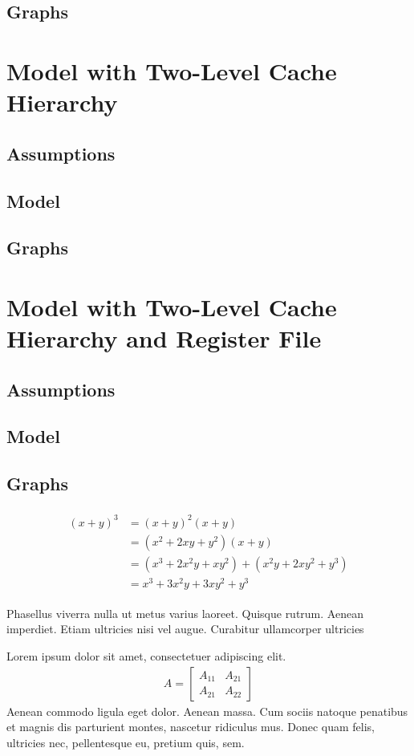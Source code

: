\documentclass[paper=a4, fontsize=11pt]{scrartcl} %
\numberwithin{equation}{section} %
\numberwithin{figure}{section} %
\numberwithin{table}{section} %
\begin{document}
\subsection{Graphs}
\section{Model with Two-Level Cache Hierarchy}
\subsection{Assumptions}
\subsection{Model}
\subsection{Graphs}
\section{Model with Two-Level Cache Hierarchy and Register File}
\subsection{Assumptions}
\subsection{Model}
\subsection{Graphs}

\begin{align} 
\begin{split}
(x+y)^3 	&= (x+y)^2(x+y)\\
&=(x^2+2xy+y^2)(x+y)\\
&=(x^3+2x^2y+xy^2) + (x^2y+2xy^2+y^3)\\
&=x^3+3x^2y+3xy^2+y^3
\end{split}					
\end{align}

Phasellus viverra nulla ut metus varius laoreet. Quisque rutrum. Aenean imperdiet. Etiam ultricies nisi vel augue. Curabitur ullamcorper ultricies



Lorem ipsum dolor sit amet, consectetuer adipiscing elit. 
\begin{align}
A = 
\begin{bmatrix}
A_{11} & A_{21} \\
A_{21} & A_{22}
\end{bmatrix}
\end{align}
Aenean commodo ligula eget dolor. Aenean massa. Cum sociis natoque penatibus et magnis dis parturient montes, nascetur ridiculus mus. Donec quam felis, ultricies nec, pellentesque eu, pretium quis, sem.
\end{document}
